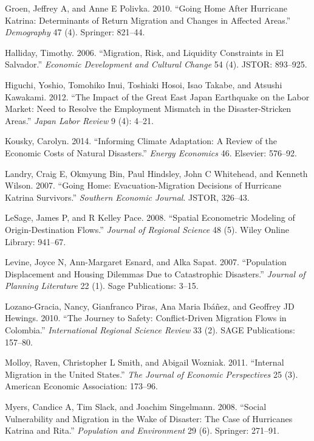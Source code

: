 \documentclass[]{article}
\begin{document}
\hypertarget{ref-groen2010going}{}
Groen, Jeffrey A, and Anne E Polivka. 2010. ``Going Home After Hurricane
Katrina: Determinants of Return Migration and Changes in Affected
Areas.'' \emph{Demography} 47 (4). Springer: 821--44.

\hypertarget{ref-halliday2006migration}{}
Halliday, Timothy. 2006. ``Migration, Risk, and Liquidity Constraints in
El Salvador.'' \emph{Economic Development and Cultural Change} 54 (4).
JSTOR: 893--925.

\hypertarget{ref-higuchi2012impact}{}
Higuchi, Yoshio, Tomohiko Inui, Toshiaki Hosoi, Isao Takabe, and Atsushi
Kawakami. 2012. ``The Impact of the Great East Japan Earthquake on the
Labor Market: Need to Resolve the Employment Mismatch in the
Disaster-Stricken Areas.'' \emph{Japan Labor Review} 9 (4): 4--21.

\hypertarget{ref-kousky2014informing}{}
Kousky, Carolyn. 2014. ``Informing Climate Adaptation: A Review of the
Economic Costs of Natural Disasters.'' \emph{Energy Economics} 46.
Elsevier: 576--92.

\hypertarget{ref-landry2007going}{}
Landry, Craig E, Okmyung Bin, Paul Hindsley, John C Whitehead, and
Kenneth Wilson. 2007. ``Going Home: Evacuation-Migration Decisions of
Hurricane Katrina Survivors.'' \emph{Southern Economic Journal}. JSTOR,
326--43.

\hypertarget{ref-lesage2008spatial}{}
LeSage, James P, and R Kelley Pace. 2008. ``Spatial Econometric Modeling
of Origin-Destination Flows.'' \emph{Journal of Regional Science} 48
(5). Wiley Online Library: 941--67.

\hypertarget{ref-levine2007population}{}
Levine, Joyce N, Ann-Margaret Esnard, and Alka Sapat. 2007. ``Population
Displacement and Housing Dilemmas Due to Catastrophic Disasters.''
\emph{Journal of Planning Literature} 22 (1). Sage Publications: 3--15.

\hypertarget{ref-lozano2010journey}{}
Lozano-Gracia, Nancy, Gianfranco Piras, Ana Maria Ibáñez, and Geoffrey
JD Hewings. 2010. ``The Journey to Safety: Conflict-Driven Migration
Flows in Colombia.'' \emph{International Regional Science Review} 33
(2). SAGE Publications: 157--80.

\hypertarget{ref-molloy2011internal}{}
Molloy, Raven, Christopher L Smith, and Abigail Wozniak. 2011.
``Internal Migration in the United States.'' \emph{The Journal of
Economic Perspectives} 25 (3). American Economic Association: 173--96.

\hypertarget{ref-myers2008social}{}
Myers, Candice A, Tim Slack, and Joachim Singelmann. 2008. ``Social
Vulnerability and Migration in the Wake of Disaster: The Case of
Hurricanes Katrina and Rita.'' \emph{Population and Environment} 29 (6).
Springer: 271--91.
\end{document}
